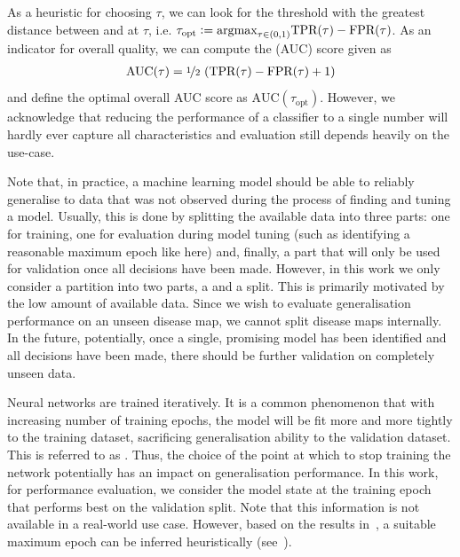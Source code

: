 \documentclass[
	fontsize=10pt, %
	twoside=true, %
	secnumdepth=1, %
  toc=indentunnumbered %
]{kaobook}
\begin{document}
As a heuristic for choosing $\tau$, we can look for the threshold with the greatest
distance between \TPR{} and \FPR{} at $\tau$, i.e. $\tau_{\text{opt}} := \argmax_{\tau \in
  (0,1)} \TPR{}(\tau) - \FPR{}(\tau)$.
As an indicator for overall quality, we can compute the 
(AUC) score given as
\begin{align*}
  \text{AUC}(\tau) = \nicefrac{1}{2}~(\TPR{}(\tau) - \FPR{}(\tau) + 1)
\end{align*}
and define the optimal overall AUC score as $\text{AUC}(\tau_{\text{opt}})$.
However, we acknowledge that reducing the performance of a classifier to a
single number will hardly ever capture all characteristics and evaluation still
depends heavily on the use-case.


Note that, in practice, a machine learning model should be able to reliably generalise to data
that was not observed during the process of finding and tuning a model. Usually,
this is done by splitting the available data into three parts: one for training,
one for evaluation during model tuning (such as identifying a reasonable maximum
epoch like here) and, finally, a part that will only be used for validation once
all decisions have been made.
%
However, in this work we only consider a partition into two parts, a
 and a  split. This is primarily motivated by the
low amount of available data. Since we wish to evaluate generalisation
performance on an unseen disease map, we cannot split disease maps internally. %
In the future, potentially, once a single, promising model has been identified
and all decisions have been made, there should be further validation on completely
unseen data.

Neural networks are trained iteratively. It is a common phenomenon that with
increasing number of training epochs, the model will be fit more and more
tightly to the training dataset, sacrificing generalisation ability to the
validation dataset. This is referred to as . Thus, the choice
of the point at which to stop training the network potentially has an impact on
generalisation performance. In this work, for performance evaluation, we
consider the model state at the training epoch that performs best on the
validation split. Note that this information is not available in a real-world
use case. However, based on the results in~, a suitable maximum epoch
can be inferred heuristically (see~).
\end{document}

